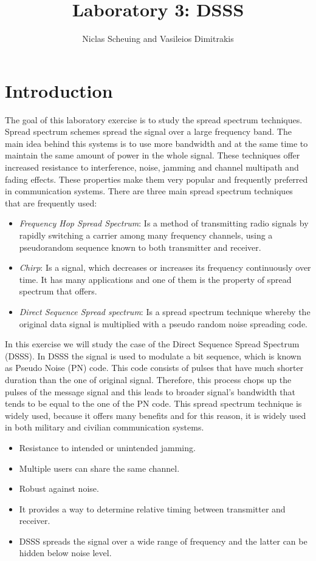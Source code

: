 \documentclass[12pt,a4paper]{article}
\title{Laboratory 3: DSSS}
\author{Niclas Scheuing and Vasileios Dimitrakis}
\begin{document}
	\maketitle
	
	\section{Introduction}
	The goal of this laboratory exercise is to study the spread spectrum techniques. Spread spectrum schemes spread the signal over a large frequency band. The main idea behind this systems is to use more bandwidth and at the same time to maintain the same amount of power in the whole signal. These techniques offer increased resistance to interference, noise, jamming and channel multipath and fading effects. These properties make them very popular and frequently preferred in communication systems. 
	There are three main spread spectrum techniques that are frequently used:
	\begin{itemize}
	\item{\emph{Frequency Hop Spread Spectrum}: Is a method of transmitting radio signals by rapidly switching a carrier among many frequency channels, using a pseudorandom sequence known to both transmitter and receiver.}
	\item{\emph{Chirp}: Is a signal, which decreases or increases its frequency continuously over time. It has many applications and one of them is the property of spread spectrum that offers.}
	\item{\emph{Direct Sequence Spread spectrum}: Is a spread spectrum technique whereby the original data signal is multiplied with a pseudo random noise spreading code.}
	\end{itemize}
	
	In this exercise we will study the case of the Direct Sequence Spread Spectrum (DSSS).
	In DSSS the signal is used to modulate a bit sequence, which is known as Pseudo Noise (PN) code. This code consists of pulses that have much shorter duration than the one of original signal. Therefore, this process chops up the pulses of the message signal and this leads to broader signal's bandwidth that tends to be equal to the one of the PN code. 
	This spread spectrum technique is widely used, because it offers many benefits and for this reason, it is widely used in both military and civilian communication systems.
	
	\begin{itemize}
	\item{Resistance to intended or unintended jamming.}
	\item{Multiple users can share the same channel.}
	\item{Robust against noise.}
	\item{It provides a way to determine relative timing between transmitter and receiver.}
	\item{DSSS spreads the signal over a wide range of frequency and the latter can be hidden below noise level.}
	\end{itemize}
	
\end{document}
